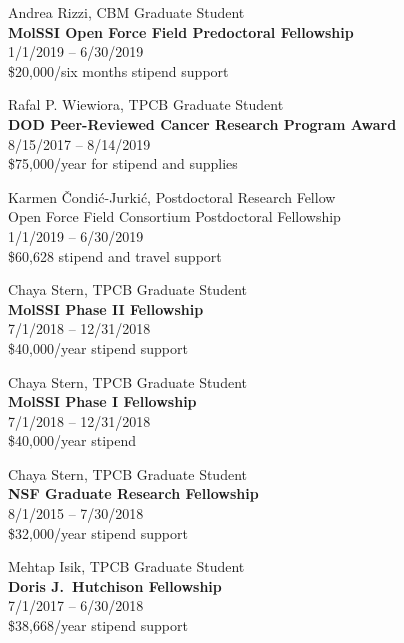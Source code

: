 \documentclass[10pt]{article}
\begin{document}
\vspace{1.5ex}

Andrea Rizzi, CBM Graduate Student\\
{\bf MolSSI Open Force Field Predoctoral Fellowship}\\
1/1/2019 -- 6/30/2019\\
\$20,000/six months stipend support

\vspace{1.5ex}

Rafal P. Wiewiora, TPCB Graduate Student\\
{\bf DOD Peer-Reviewed Cancer Research Program Award}\\
8/15/2017 -- 8/14/2019\\
 \$75,000/year for stipend and supplies

\vspace{1.5ex}

Karmen \v{C}ondi\'{c}-Jurki\'{c}, Postdoctoral Research Fellow\\
{Open Force Field Consortium Postdoctoral Fellowship}\\
1/1/2019 -- 6/30/2019\\
\$60,628 stipend and travel support

\vspace{1.5ex}

Chaya Stern, TPCB Graduate Student\\
{\bf MolSSI Phase II Fellowship}\\
7/1/2018 -- 12/31/2018\\
\$40,000/year stipend support

\vspace{1.5ex}

Chaya Stern, TPCB Graduate Student\\
{\bf MolSSI Phase I Fellowship}\\
7/1/2018 -- 12/31/2018\\
\$40,000/year stipend

\vspace{1.5ex}	

Chaya Stern, TPCB Graduate Student\\
{\bf NSF Graduate Research Fellowship}\\
8/1/2015 -- 7/30/2018\\
\$32,000/year stipend support

\vspace{1.5ex}

Mehtap Isik, TPCB Graduate Student\\
{\bf Doris J.~Hutchison Fellowship}\\
7/1/2017 -- 6/30/2018\\
\$38,668/year stipend support
\end{document}

